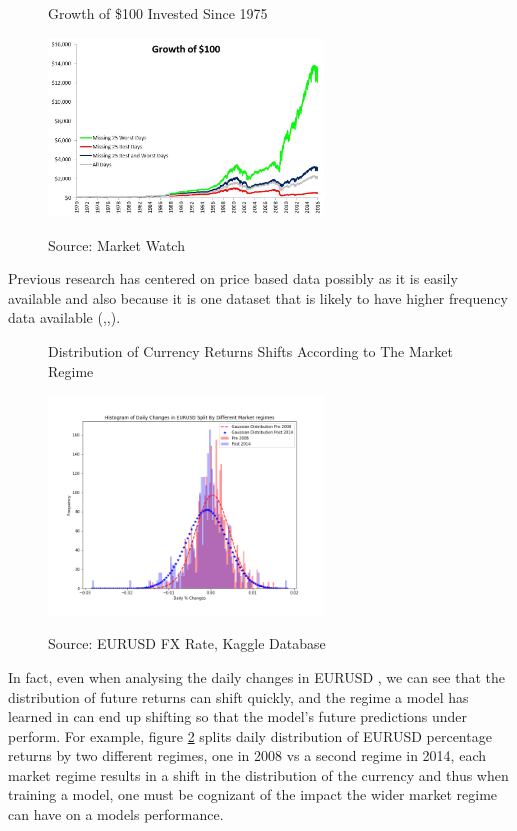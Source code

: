 \documentclass[11pt, a4paper]{article}
\begin{document}
\begin{figure}[h]
    \centering
	\caption{Growth of \$100 Invested Since 1975}
    \includegraphics[width=0.65\textwidth]{beststockdays}    
    \label{fig:beststockdays}
	\caption*{Source: Market Watch\cite{bestdays}}
\end{figure}
Previous research has centered on price based data possibly as it is easily available and also because it is one dataset that is likely to have higher frequency data available (\cite{Huang2005},\cite{Shen2012},\cite{Wang2014}). 

\begin{figure}[h]
    \centering
	\caption{Distribution of Currency Returns Shifts According to The Market Regime}
     \includegraphics[width=0.65\textwidth]{Regimehist}
    \label{fig:Regimehist}
\caption*{Source: EURUSD FX Rate, Kaggle Database}
\end{figure}
In fact, even when analysing the daily changes in EURUSD , we can see that the distribution of future returns can shift quickly, and the regime a model has learned in can end up shifting so that the model's future predictions under perform. For example, figure \ref{fig:Regimehist} splits daily distribution of EURUSD percentage returns by two different regimes, one in 2008 vs a second regime in 2014, each market regime results in a shift in the distribution of the currency and thus when training a model, one must be cognizant of the impact the wider market regime can have on a models performance.
\end{document}
